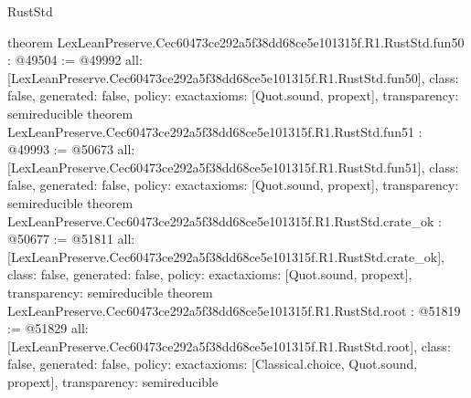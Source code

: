 \begin{lexlean}{RustStd}
\begin{coremodule}
{}
theorem LexLeanPreserve.Cec60473ce292a5f38dd68ce5e101315f.R1.RustStd.fun50 : @49504 := @49992 {
  all: [LexLeanPreserve.Cec60473ce292a5f38dd68ce5e101315f.R1.RustStd.fun50],
  class: false,
  generated: false,
  policy: exact{axioms: [Quot.sound, propext]},
  transparency: semireducible
}
theorem LexLeanPreserve.Cec60473ce292a5f38dd68ce5e101315f.R1.RustStd.fun51 : @49993 := @50673 {
  all: [LexLeanPreserve.Cec60473ce292a5f38dd68ce5e101315f.R1.RustStd.fun51],
  class: false,
  generated: false,
  policy: exact{axioms: [Quot.sound, propext]},
  transparency: semireducible
}
theorem LexLeanPreserve.Cec60473ce292a5f38dd68ce5e101315f.R1.RustStd.crate_ok : @50677 := @51811 {
  all: [LexLeanPreserve.Cec60473ce292a5f38dd68ce5e101315f.R1.RustStd.crate_ok],
  class: false,
  generated: false,
  policy: exact{axioms: [Quot.sound, propext]},
  transparency: semireducible
}
theorem LexLeanPreserve.Cec60473ce292a5f38dd68ce5e101315f.R1.RustStd.root : @51819 := @51829 {
  all: [LexLeanPreserve.Cec60473ce292a5f38dd68ce5e101315f.R1.RustStd.root],
  class: false,
  generated: false,
  policy: exact{axioms: [Classical.choice, Quot.sound, propext]},
  transparency: semireducible
}


\end{coremodule}
\end{lexlean}
